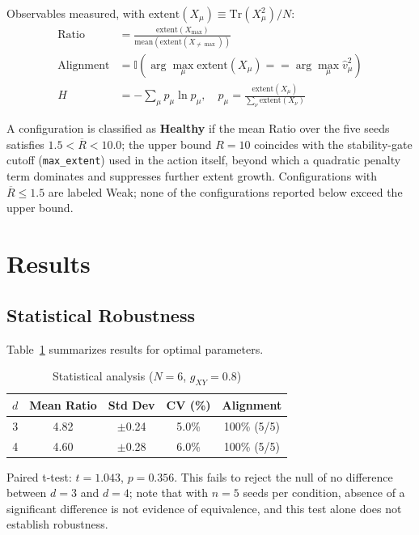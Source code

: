 \documentclass[12pt,a4paper]{article}
\begin{document}
Observables measured, with $\text{extent}(X_\mu) \equiv \text{Tr}(X_\mu^2)/N$:
\begin{align}
\text{Ratio} &= \frac{\text{extent}(X_{\max})}{\text{mean}(\text{extent}(X_{\neq \max}))} \\
\text{Alignment} &= \mathbb{I}(\arg\max_\mu \text{extent}(X_\mu) == \arg\max_\mu \hat{v}_\mu^2) \\
H &= -\sum_\mu p_\mu \ln p_\mu, \quad p_\mu = \frac{\text{extent}(X_\mu)}{\sum_\nu \text{extent}(X_\nu)}
\end{align}

A configuration is classified as \textbf{Healthy} if the mean Ratio over
the five seeds satisfies $1.5 < \overline{R} < 10.0$; the upper bound
$R=10$ coincides with the stability-gate cutoff (\texttt{max\_extent}) used
in the action itself, beyond which a quadratic penalty term dominates and
suppresses further extent growth. Configurations with $\overline{R} \leq 1.5$
are labeled Weak; none of the configurations reported below exceed the
upper bound.

\section{Results}\label{sec:results}

\subsection{Statistical Robustness}

Table~\ref{tab:stats} summarizes results for optimal parameters.

\begin{table}[ht]
\centering
\caption{Statistical analysis ($N=6$, $g_{XY}=0.8$)}
\label{tab:stats}
\begin{tabular}{ccccc}
\toprule
$d$ & Mean Ratio & Std Dev & CV (\%) & Alignment \\
\midrule
3 & 4.82 & $\pm$0.24 & 5.0\% & 100\% (5/5) \\
4 & 4.60 & $\pm$0.28 & 6.0\% & 100\% (5/5) \\
\bottomrule
\end{tabular}
\end{table}

Paired t-test: $t = 1.043$, $p = 0.356$. This fails to reject the null
of no difference between $d=3$ and $d=4$; note that with $n=5$ seeds per
condition, absence of a significant difference is not evidence of
equivalence, and this test alone does not establish robustness.
\end{document}

